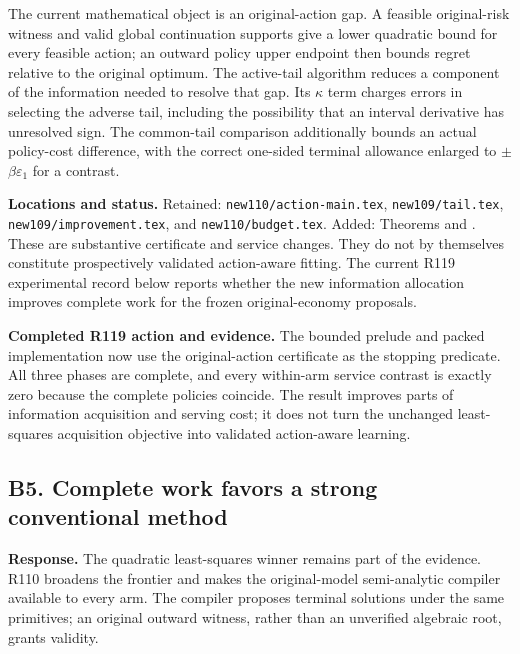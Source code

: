 The current mathematical object is an original-action gap. A feasible original-risk witness and valid global continuation supports give a lower quadratic bound for every feasible action; an outward policy upper endpoint then bounds regret relative to the original optimum. The active-tail algorithm reduces a component of the information needed to resolve that gap. Its \ensuremath{\kappa} term charges errors in selecting the adverse tail, including the possibility that an interval derivative has unresolved sign. The common-tail comparison additionally bounds an actual policy-cost difference, with the correct one-sided terminal allowance enlarged to \ensuremath{\pm}\ensuremath{\beta}\ensuremath{\varepsilon_1} for a contrast.

\textbf{Locations and status.} Retained: \nolinkurl{new110/action-main.tex}, \nolinkurl{new109/tail.tex}, \nolinkurl{new109/improvement.tex}, and \nolinkurl{new110/budget.tex}. Added: Theorems  and . These are substantive certificate and service changes. They do not by themselves constitute prospectively validated action-aware fitting. The current R119 experimental record below reports whether the new information allocation improves complete work for the frozen original-economy proposals.

\textbf{Completed R119 action and evidence.} The bounded prelude and packed implementation now use the original-action certificate as the stopping predicate. All three phases are complete, and every within-arm service contrast is exactly zero because the complete policies coincide. The result improves parts of information acquisition and serving cost; it does not turn the unchanged least-squares acquisition objective into validated action-aware learning.

\hypertarget{b5.-complete-work-favors-a-strong-conventional-method}{%
\subsection{B5. Complete work favors a strong conventional method}\label{b5.-complete-work-favors-a-strong-conventional-method}}

\textbf{Response.} The quadratic least-squares winner remains part of the evidence. R110 broadens the frontier and makes the original-model semi-analytic compiler available to every arm. The compiler proposes terminal solutions under the same primitives; an original outward witness, rather than an unverified algebraic root, grants validity.

